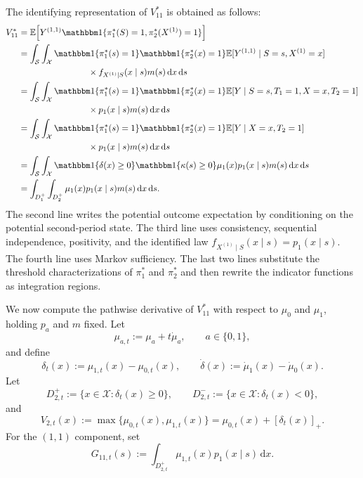 \documentclass[12pt]{article}
\newcommand{\1}{\mathbf{1}}
\begin{document}
The identifying representation of $V_{11}^*$ is obtained as follows:
\begin{align*}
V_{11}^*
&=
\mathbb E\!\left[
Y^{(1,1)}
\mathbbm 1\{\pi_1^*(S)=1,\pi_2^*(X^{(1)})=1\}
\right] \\
&=
\int_{\mathcal S}
\int_{\mathcal X}
\mathbbm 1\{\pi_1^*(s)=1\}
\mathbbm 1\{\pi_2^*(x)=1\}
\mathbb E[Y^{(1,1)}\mid S=s,X^{(1)}=x] \\
&\qquad\qquad\qquad\qquad
\times f_{X^{(1)}\mid S}(x\mid s)m(s)\,\mathrm dx\,\mathrm ds \\
&=
\int_{\mathcal S}
\int_{\mathcal X}
\mathbbm 1\{\pi_1^*(s)=1\}
\mathbbm 1\{\pi_2^*(x)=1\}
\mathbb E[Y\mid S=s,T_1=1,X=x,T_2=1] \\
&\qquad\qquad\qquad\qquad
\times p_1(x\mid s)m(s)\,\mathrm dx\,\mathrm ds \\
&=
\int_{\mathcal S}
\int_{\mathcal X}
\mathbbm 1\{\pi_1^*(s)=1\}
\mathbbm 1\{\pi_2^*(x)=1\}
\mathbb E[Y\mid X=x,T_2=1] \\
&\qquad\qquad\qquad\qquad
\times p_1(x\mid s)m(s)\,\mathrm dx\,\mathrm ds \\
&=
\int_{\mathcal S}
\int_{\mathcal X}
\mathbbm 1\{\delta(x)\geq 0\}
\mathbbm 1\{\kappa(s)\geq 0\}
\mu_1(x)p_1(x\mid s)m(s)\,\mathrm dx\,\mathrm ds \\
&=
\int_{D_1^+}\int_{D_2^+}
\mu_1(x)p_1(x\mid s)m(s)\,\mathrm dx\,\mathrm ds.
\end{align*}
The second line writes the potential outcome expectation by conditioning on
the potential second-period state. The third line uses consistency, sequential
independence, positivity, and the identified law
$f_{X^{(1)}\mid S}(x\mid s)=p_1(x\mid s)$. The fourth line uses Markov
sufficiency. The last two lines substitute the threshold characterizations of
$\pi_1^*$ and $\pi_2^*$ and then rewrite the indicator functions as integration
regions.

We now compute the pathwise derivative of $V_{11}^*$ with respect to
$\mu_0$ and $\mu_1$, holding $p_a$ and $m$ fixed. Let
\[
\mu_{a,t}:=\mu_a+t\dot\mu_a,
\qquad a\in\{0,1\},
\]
and define
\[
\delta_t(x):=\mu_{1,t}(x)-\mu_{0,t}(x),
\qquad
\dot\delta(x):=\dot\mu_1(x)-\dot\mu_0(x).
\]
Let
\[
D_{2,t}^+ := \{x\in\mathcal X:\delta_t(x)\geq 0\},
\qquad
D_{2,t}^- := \{x\in\mathcal X:\delta_t(x)<0\},
\]
and
\[
V_{2,t}(x)
:=
\max\{\mu_{0,t}(x),\mu_{1,t}(x)\}
=
\mu_{0,t}(x)+[\delta_t(x)]_+.
\]
For the $(1,1)$ component, set
\[
G_{11,t}(s)
:=
\int_{D_{2,t}^+}\mu_{1,t}(x)p_1(x\mid s)\,\mathrm dx.
\]
\end{document}
